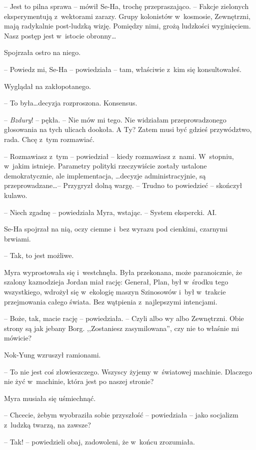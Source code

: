 \documentclass[oneside,polish,11pt,sfheadings]{mwbk}
\begin{document}
-- Jest to pilna sprawa -- mówił Se-Ha, trochę przepraszająco. -- Fakcje
zielonych eksperymentują z~wektorami zarazy. Grupy kolonistów w~kosmosie, Zewnętrzni, mają radykalnie post-ludzką wizję. Pomiędzy nimi,
grożą ludzkości wyginięciem. Nasz postęp jest w~istocie obronny\ldots

Spojrzała ostro na niego. 

-- Powiedz mi, Se-Ha -- powiedziała -- tam,
właściwie z~kim się konsultowałeś.

Wyglądał na zakłopotanego. 

-- To była\ldots decyzja rozproszona. Konsensus.

-- \textit{Bzdury}! -- pękła. -- Nie mów mi tego. Nie widziałam
przeprowadzonego głosowania na tych ulicach dookoła. A Ty? Zatem musi
być gdzieś przywództwo, rada. Chcę z~tym rozmawiać.

-- Rozmawiasz z~tym -- powiedział -- kiedy rozmawiasz z~nami. W~stopniu, w~jakim istnieje. Parametry polityki rzeczywiście zostały ustalone
demokratycznie, ale implementacja, \ldots decyzje administracyjnie, są
przeprowadzane\ldots -- Przygryzł dolną wargę. -- Trudno to powiedzieć -- skończył kulawo.

-- Niech zgadnę -- powiedziała Myra, wstając. -- System ekspercki. AI.

Se-Ha spojrzał na nią, oczy ciemne i~bez wyrazu pod cienkimi, czarnymi
brwiami. 

-- Tak, to jest możliwe.

Myra wyprostowała się i~westchnęła. Była przekonana, może paranoicznie,
że szalony kaznodzieja Jordan miał rację: Generał, Plan, był w~środku
tego wszystkiego, wdrożył się w~ekologię maszyn Szinosowów i~był w~trakcie przejmowania całego świata. Bez wątpienia z~najlepszymi
intencjami.

-- Boże, tak, macie rację -- powiedziała. -- Czyli albo wy albo Zewnętrzni.
Obie strony są jak jebany Borg. ,,Zostaniesz zasymilowana'', czy nie
to właśnie mi mówicie?

Nok-Yung wzruszył ramionami. 

-- To nie jest coś złowieszczego. Wszyscy
żyjemy w~światowej machinie. Dlaczego nie żyć w~machinie, która jest po
naszej stronie?

Myra musiała się uśmiechnąć. 

-- Chcecie, żebym wyobraziła sobie
przyszłość -- powiedziała -- jako socjalizm z~ludzką twarzą, na zawsze?

-- Tak! -- powiedzieli obaj, zadowoleni, że w~końcu zrozumiała.
\end{document}
